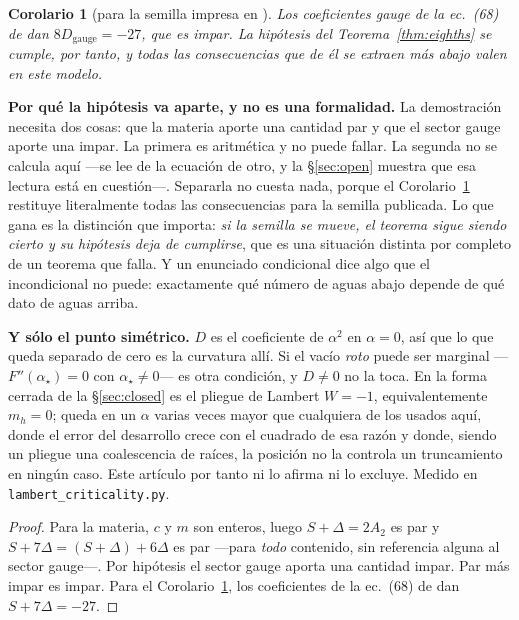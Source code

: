 \documentclass[11pt,a4paper]{article}
\newtheorem{corollary}{Corolario}
\begin{document}
\begin{corollary}[para la semilla impresa en \cite{KM25}]\label{cor:kmseed}
Los coeficientes gauge de la ec.~(68) de \cite{KM25} dan $8D_{\mathrm{gauge}}=-27$, que es impar.
La hipótesis del Teorema~\ref{thm:eighths} se cumple, por tanto, y todas las consecuencias que de
él se extraen más abajo valen en este modelo.
\end{corollary}

\noindent \textbf{Por qué la hipótesis va aparte, y no es una formalidad.} La demostración necesita
dos cosas: que la materia aporte una cantidad par y que el sector gauge aporte una impar. La
primera es aritmética y no puede fallar. La segunda no se calcula aquí ---se lee de la ecuación de
otro, y la \S\ref{sec:open} muestra que esa lectura está en cuestión---. Separarla no cuesta nada,
porque el Corolario~\ref{cor:kmseed} restituye literalmente todas las consecuencias para la semilla
publicada. Lo que gana es la distinción que importa: \emph{si la semilla se mueve, el teorema sigue
siendo cierto y su hipótesis deja de cumplirse}, que es una situación distinta por completo de un
teorema que falla. Y un enunciado condicional dice algo que el incondicional no puede: exactamente qué número de aguas abajo depende de qué dato de aguas arriba.

\noindent \textbf{Y sólo el punto simétrico.} $D$ es el coeficiente de $\alpha^2$ en $\alpha=0$, así
que lo que queda separado de cero es la curvatura allí. Si el vacío \emph{roto} puede ser marginal
---$F''(\alpha_\star)=0$ con $\alpha_\star\neq0$--- es otra condición, y $D\neq0$ no la toca. En la
forma cerrada de la \S\ref{sec:closed} es el pliegue de Lambert $W=-1$, equivalentemente $m_h=0$;
queda en un $\alpha$ varias veces mayor que cualquiera de los usados aquí, donde el error del
desarrollo crece con el cuadrado de esa razón y donde, siendo un pliegue una coalescencia de
raíces, la posición no la controla un truncamiento en ningún caso. Este artículo por tanto ni lo
afirma ni lo excluye. Medido en \texttt{lambert\_\allowbreak criticality.py}.
\begin{proof}
Para la materia, $c$ y $m$ son enteros, luego $S+\Delta=2A_2$ es par y $S+7\Delta=(S+\Delta)+6\Delta$
es par ---para \emph{todo} contenido, sin referencia alguna al sector gauge---. Por hipótesis el
sector gauge aporta una cantidad impar. Par más impar es impar. Para el
Corolario~\ref{cor:kmseed}, los coeficientes de la ec.~(68) de \cite{KM25} dan $S+7\Delta=-27$.
\end{proof}
\end{document}
